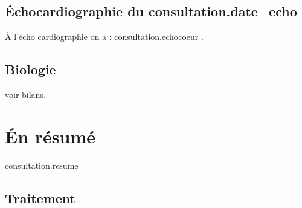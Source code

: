 \documentclass[12pt,a4paper]{article}
\begin{document}
{{{{{{{              {%
                
                \subsection{Échocardiographie du {{ consultation.date_echo }} }
                
                À l'écho cardiographie on a : {{consultation.echocoeur }}.\\
                
                {%
                  
                  \subsection{Biologie}

                  voir bilans. \\
                  
                  \section{Én résumé}
                  
                  {{ consultation.resume }}
                  
                  \subsection{Traitement}
                  
}}}}}}}}}
\end{document}
